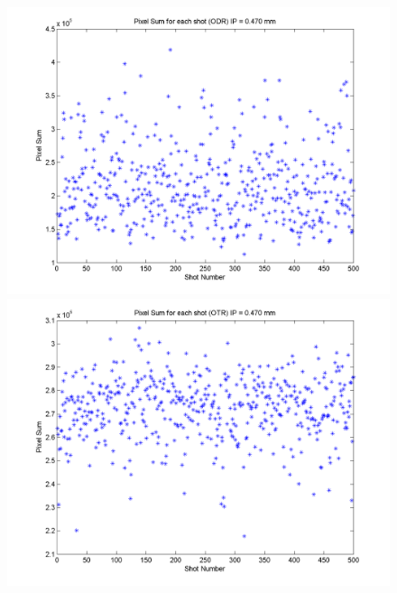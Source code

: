 \documentclass[12pt]{article}
\begin{document}
\begin{figure}
\begin{center}
\includegraphics[scale=0.5]{Figures/PixelSum_ODR_470.PNG}
\includegraphics[scale=0.5]{Figures/PixelSum_OTR_470.PNG}
\caption{}
\end{center}
\end{figure}
\end{document}
